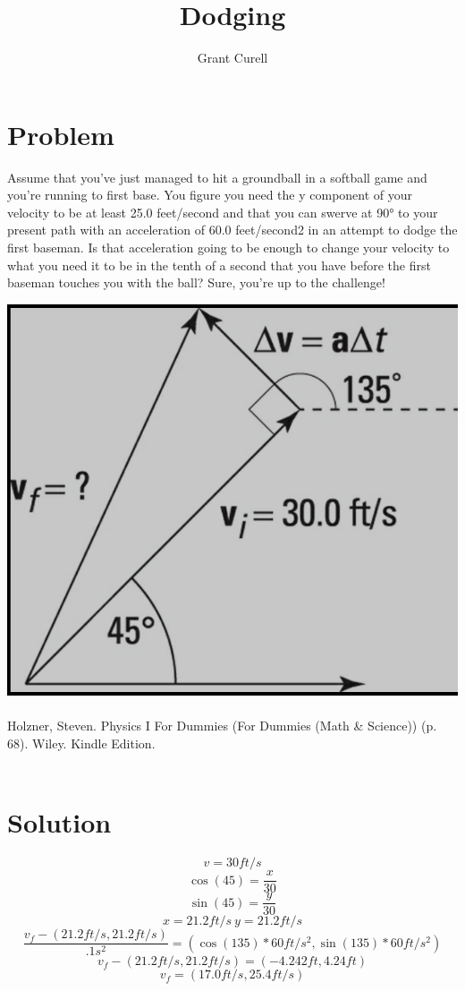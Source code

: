 \documentclass{article}
\title{Dodging}
\author{Grant Curell}
\begin{document}
\maketitle{}
\section{Problem}
Assume that you’ve just managed to hit a groundball in a softball game and you’re running to first base. You figure you need the y component of your velocity to be at least 25.0 feet/second and that you can swerve at \ang{90} to your present path with an acceleration of 60.0 feet/second2 in an attempt to dodge the first baseman. Is that acceleration going to be enough to change your velocity to what you need it to be in the tenth of a second that you have before the first baseman touches you with the ball? Sure, you’re up to the challenge!

\includegraphics[width=\columnwidth]{image}
\\\\
Holzner, Steven. Physics I For Dummies (For Dummies (Math \& Science)) (p. 68). Wiley. Kindle Edition.
\\\\
\section{Solution}
\[ v=30ft/s \]
\[ \cos(45)=\frac{x}{30} \]
\[ \sin(45)=\frac{y}{30} \]
\[ x=21.2ft/s\ y=21.2ft/s \]
\[ \frac{v_f-(21.2ft/s,21.2ft/s)}{.1s^2}=(\cos(135)*60ft/s^2,\sin(135)*60ft/s^2)\]
\[ v_f-(21.2ft/s,21.2ft/s)=(-4.242ft,4.24ft) \]
\[ v_f=(17.0ft/s,25.4ft/s) \]
\end{document}
